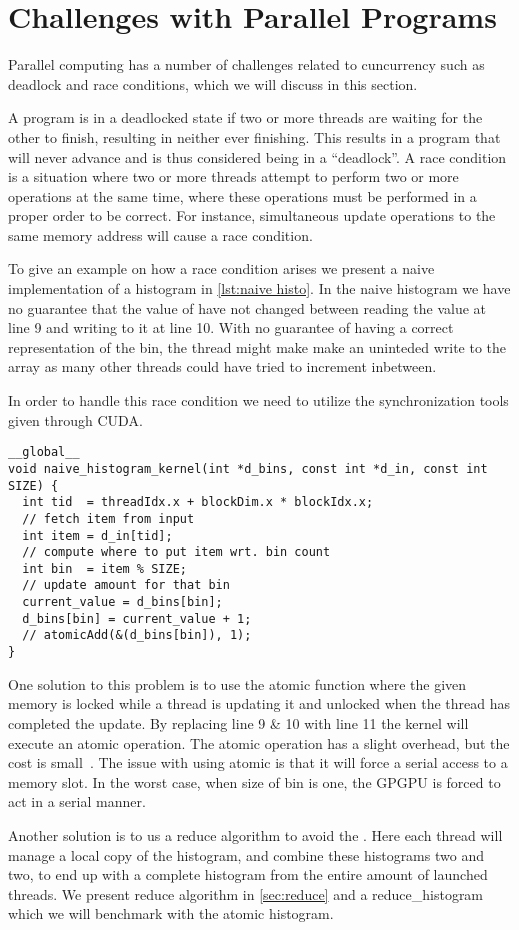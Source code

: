 \section{Challenges with Parallel Programs}
\label{sec:challenges with parallel programs}

Parallel computing has a number of challenges related to cuncurrency such as deadlock and race conditions, which we will discuss in this section.

A program is in a deadlocked state if two or more threads are waiting for the other to finish, resulting in neither ever finishing.
This results in a program that will never advance and is thus considered being in a ``deadlock''.
A race condition is a situation where two or more threads attempt to perform two or more operations at the same time, where these operations must be performed in a proper order to be correct.
For instance, simultaneous update operations to the same memory address will cause a race condition.~\cite{farber2011cuda}

To give an example on how a race condition arises we present a naive implementation of a histogram in \cref{lst:naive histo}.
In the naive histogram we have no guarantee that the value of  have not changed between reading the value at line 9 and writing to it at line 10.
With no guarantee of having a correct representation of the bin, the thread might make make an uninteded write to the array as many other threads could have tried to increment inbetween.

In order to handle this race condition we need to utilize the synchronization tools given through CUDA.

\begin{lstlisting}[caption={Naive histogram implementation with race condition}, label={lst:naive histo}]
__global__
void naive_histogram_kernel(int *d_bins, const int *d_in, const int SIZE) {
  int tid  = threadIdx.x + blockDim.x * blockIdx.x;
  // fetch item from input
  int item = d_in[tid];
  // compute where to put item wrt. bin count
  int bin  = item % SIZE;
  // update amount for that bin
  current_value = d_bins[bin];
  d_bins[bin] = current_value + 1;
  // atomicAdd(&(d_bins[bin]), 1);
}
\end{lstlisting}

One solution to this problem is to use the atomic function where the given memory is locked while a thread is updating it and unlocked when the thread has completed the update.
By replacing line 9 \& 10 with line 11 the kernel will execute an atomic operation.
The atomic operation has a slight overhead, but the cost is small~\cite{udacity}.
The issue with using atomic is that it will force a serial access to a memory slot.
In the worst case, when size of bin is one, the GPGPU is forced to act in a serial manner.

Another solution is to us a reduce algorithm to avoid the .
Here each thread will manage a local copy of the histogram, and combine these histograms two and two, to end up with a complete histogram from the entire amount of launched threads.
We present reduce algorithm in \cref{sec:reduce} and a reduce\_histogram which we will benchmark with the atomic histogram.
